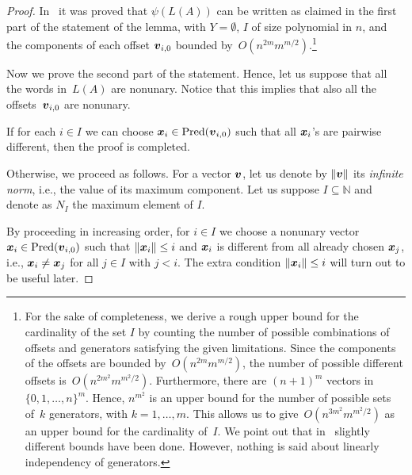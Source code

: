 \documentclass[11pt]{article}
\newcommand{\Pred}{\ensuremath{\mathrm{Pred}}}
\def\Vec#1{\mbox{\boldmath $#1$}}
\begin{document}
\begin{proof}
  In~\cite[Thms.\ 7 and 8]{KopczynskiTo2010} it was proved that $\psi(L(A))$ can be written as claimed in the
  first part of the statement of the lemma, with $Y=\emptyset$, $I$ of size polynomial in $n$,
  and the components of each offset $\Vec{v}_{i, 0}$ bounded by~$O(n^{2m}m^{m/2})$.\footnote{For the sake of completeness, we derive a rough upper bound for the cardinality of the set $I$ by counting
	the number of possible combinations of offsets and generators satisfying the given limitations.
	Since the components of the offsets are bounded by~$O(n^{2m}m^{m/2})$, the number of possible
	different offsets is~$O(n^{2m^2}m^{m^2\!/2})$.
	Furthermore, there are $(n+1)^m$ vectors in~$\{0, 1, \ldots, n\}^m$. Hence, $n^{m^2}$ is an upper bound
	for the number of possible sets of~$k$ generators, with $k=1,\ldots,m$.
	This allows us to give~$O(n^{3m^2}m^{m^2\!/2})$ as an upper bound for the cardinality of~$I$.
	We point out that in~\cite[Thm.\ 4.1]{To2010} slightly different bounds have been done.
	However, nothing is said about linearly independency of generators.\label{noteA}
}

	Now we prove the second part of the statement. Hence, let us suppose that all the words in~$L(A)$ are
	nonunary. Notice that this implies that also all the offsets~$\Vec{v}_{i, 0}$ are nonunary.

  If for each $i\in I$ we can choose $\Vec{x}_i \in \Pred(\Vec{v}_{i, 0})$ such that all
  $\Vec{x}_i$'s are pairwise different, then the proof is completed.
  
  Otherwise, we proceed as follows.
  For a vector $\Vec{v}$, let us denote by $\|\Vec{v}\|$ its \emph{infinite norm}, i.e., the value
  of its  maximum component.
  Let us suppose $I\subseteq\mathbb{N}$ and denote as $N_I$ the maximum element of $I$.
  
  By proceeding in increasing order, for $i\in I$ we choose a nonunary vector 
  $\Vec{x}_i \in \Pred(\Vec{v}_{i, 0})$
  such that $\|\Vec{x}_i\|\le i$ and $\Vec{x}_i$ is different from all already chosen $\Vec{x}_j$,
  i.e., $\Vec{x}_i\neq\Vec{x}_j$ for all $j\in I$ with $j<i$. The extra condition $\|\Vec{x}_i\|\le i$ 
  will turn out to be useful later.
  

\end{proof}
\end{document}
